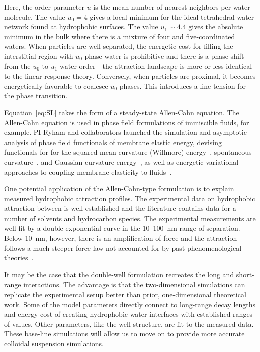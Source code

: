 Here, the order parameter $u$ is the mean number of nearest neighbors
per water molecule. The value $u_0 = 4$ gives a local minimum for the
ideal tetrahedral water network found at hydrophobic surfaces. The value
$u_1 \sim 4.4$ gives the absolute minimum in the bulk where there is a
mixture of four and five-coordinated waters. When particles are
well-separated, the energetic cost for filling the interstitial region
with $u_0$-phase water is prohibitive and there is a phase shift from
the $u_0$ to $u_1$ water order---the attraction landscape is more or
less identical to the linear response theory. Conversely, when particles
are proximal, it becomes energetically favorable to coalesce
$u_0$-phases. This introduces a line tension for the phase transition.

Equation~\eqref{eq:SL} takes the form of a steady-state Allen-Cahn
equation. The Allen-Cahn equation is used in phase field formulations of
immiscible fluids, for example. PI Ryham and collaborators launched the
simulation and asymptotic analysis of phase field functionals of
membrane elastic energy, devising functionals for for the squared mean
curvature (Willmore) energy~\cite{0951-7715-18-3-016}, spontaneous
curvature~\cite{Du05}, and Gaussian curvature energy~\cite{DuEuler}, as
well as energetic variational approaches to coupling membrane elasticity
to fluids~\cite{QiangDu09}. 

One potential application of the Allen-Cahn-type formulation is to
explain measured hydrophobic attraction profiles. The experimental data
on hydrophobic attraction between  is
well-established and the literature contains data for a number of
solvents and hydrocarbon species. The experimental measurements are
well-fit by a double exponential curve in the 10--100~nm range of
separation. Below 10~nm, however, there is an amplification of force and
the attraction follows a much steeper force law not accounted for by
past phenomenological theories~\cite{Lin2005}.

It may be the case that the double-well formulation recreates the long
and short-range interactions. The advantage is that the two-dimensional
simulations can replicate the experimental setup better than prior,
one-dimensional theoretical work. Some of the model parameters directly
connect to long-range decay lengths and energy cost of creating
hydrophobic-water interfaces with established ranges of values. Other
parameters, like the well structure, are fit to the measured data. These
base-line simulations will allow us to move on to provide more accurate
colloidal suspension simulations. 

